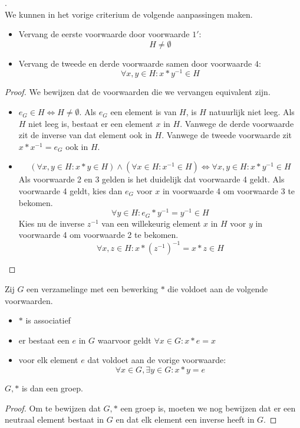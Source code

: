 \documentclass[main.tex]{subfiles}
\begin{document}
\begin{st}
  .\\
  We kunnen in het vorige criterium de volgende aanpassingen maken.
  \begin{itemize}
  \item Vervang de eerste voorwaarde door voorwaarde $1'$:
    \[ H \neq \emptyset \]
  \item Vervang de tweede en derde voorwaarde samen door voorwaarde $4$:
      \[ \forall x,y \in H: x * y^{-1} \in H \]
   \end{itemize}

  \begin{proof}
    We bewijzen dat de voorwaarden die we vervangen equivalent zijn.
    \begin{itemize}
    \item $e_{G} \in H \Leftrightarrow H \neq \emptyset$.
      Als $e_{G}$ een element is van $H$, is $H$ natuurlijk niet leeg.
      Als $H$ niet leeg is, bestaat er een element $x$ in $H$.
      Vanwege de derde voorwaarde zit de inverse van dat element ook in $H$.
      Vanwege de tweede voorwaarde zit $x * x^{-1} = e_{G}$ ook in $H$.
    \item 
      \[ (\forall x,y \in H: x * y \in H) \wedge (\forall x \in H: x^{-1} \in H)  \Leftrightarrow \forall x,y \in H: x * y^{-1} \in H \]
      Als voorwaarde 2 en 3 gelden is het duidelijk dat voorwaarde 4 geldt.
      Als voorwaarde 4 geldt, kies dan $e_{G}$ voor $x$ in voorwaarde 4 om voorwaarde 3 te bekomen.
      \[ \forall y \in H: e_{G} * y^{-1} = y^{-1} \in H \]
      Kies nu de inverse $z^{-1}$ van een willekeurig element $x$ in $H$ voor $y$ in voorwaarde 4 om voorwaarde 2 te bekomen.
      \[ \forall x, z \in H: x * (z^{-1})^{-1} = x * z \in H \]
    \end{itemize}
  \end{proof}
\end{st}

\begin{st}
  Zij $G$ een verzamelinge met een bewerking $*$ die voldoet aan de volgende voorwaarden.
  \begin{itemize}
  \item $*$ is associatief
  \item er bestaat een $e$ in $G$ waarvoor geldt $\forall x \in G: x * e = x$
  \item voor elk element $e$ dat voldoet aan de vorige voorwaarde:
    \[ \forall x \in G, \exists y \in G: x * y = e \]
  \end{itemize}
  $G,*$ is dan een groep.

  \begin{proof}
    Om te bewijzen dat $G,*$ een groep is, moeten we nog bewijzen dat er een neutraal element bestaat in $G$ en dat elk element een inverse heeft in $G$.
  \end{proof}
\end{st}
\end{document}
